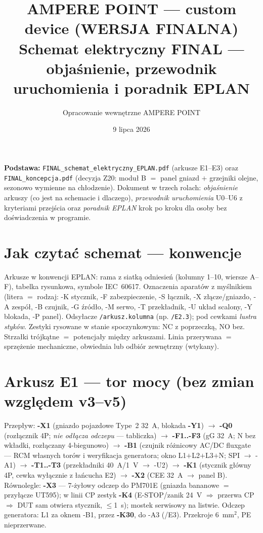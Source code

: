 \documentclass[11pt,a4paper]{article}
\title{\textbf{AMPERE POINT --- custom device (WERSJA FINALNA)}\\[4pt]
\large Schemat elektryczny FINAL --- objaśnienie, przewodnik uruchomienia i poradnik EPLAN}
\author{Opracowanie wewnętrzne AMPERE POINT}
\date{9 lipca 2026}
\begin{document}
\maketitle
\vspace{-1.6em}

\noindent\textbf{Podstawa:} \texttt{FINAL\_schemat\_elektryczny\_EPLAN.pdf} (arkusze E1--E3) oraz
\texttt{FINAL\_koncepcja.pdf} (decyzja Z20: moduł B $=$ panel gniazd $+$ grzejniki olejne, sezonowo
wymienne na chłodzenie). Dokument w trzech rolach: \emph{objaśnienie} arkuszy (co jest na schemacie
i dlaczego), \emph{przewodnik uruchomienia} U0--U6 z kryteriami przejścia oraz \emph{poradnik EPLAN}
krok po kroku dla osoby bez doświadczenia w programie.

\tableofcontents

\section{Jak czytać schemat --- konwencje}
Arkusze w konwencji EPLAN: rama z siatką odniesień (kolumny 1--10, wiersze A--F), tabelka
rysunkowa, symbole IEC~60617. Oznaczenia aparatów z myślnikiem (litera $=$ rodzaj: -K stycznik,
-F zabezpieczenie, -S łącznik, -X złącze/gniazdo, -A zespół, -B czujnik, -G źródło, -M serwo,
-T przekładnik, -U układ scalony, -Y blokada, -P panel). Odsyłacze \texttt{/arkusz.kolumna}
(np. \texttt{/E2.3}); pod cewkami \emph{lustra styków}. Zestyki rysowane w stanie spoczynkowym:
NC z poprzeczką, NO bez. Strzałki trójkątne $=$ potencjały między arkuszami. Linia przerywana $=$
sprzężenie mechaniczne, obwiednia lub odbiór zewnętrzny (wtykany).

\section{Arkusz E1 --- tor mocy (bez zmian względem v3--v5)}
Przepływ: \textbf{-X1} (gniazdo pojazdowe Type~2 32~A, blokada \textbf{-Y1}) $\to$ \textbf{-Q0}
(rozłącznik 4P; \emph{nie odłącza odczepu} --- tabliczka) $\to$ \textbf{-F1..-F3} (gG 32~A; N bez
wkładki, rozłączany 4-biegunowo) $\to$ \textbf{-B1} (czujnik różnicowy AC/DC fluxgate --- RCM
własnych torów i weryfikacja generatora; okno L1$+$L2$+$L3$+$N; SPI $\to$ -A1) $\to$
\textbf{-T1..-T3} (przekładniki 40~A/1~V $\to$ -U2) $\to$ \textbf{-K1} (stycznik główny 4P, cewka
wyłącznie z łańcucha E2) $\to$ \textbf{-X2} (CEE 32~A $\to$ panel B). Równolegle: \textbf{-X3}
--- 7-żyłowy odczep do PM701E (gniazda bananowe $=$ przyłącze UT595); w linii CP zestyk
\textbf{-K4} (E-STOP/zanik 24~V $\Rightarrow$ przerwa CP $\Rightarrow$ DUT sam otwiera stycznik,
$\le$1~s); mostek serwisowy na listwie. Odczep generatora: L1 za oknem -B1, przez \textbf{-K30},
do -A3 (/E3). Przekroje 6~mm$^2$, PE nieprzerwane.
\end{document}
